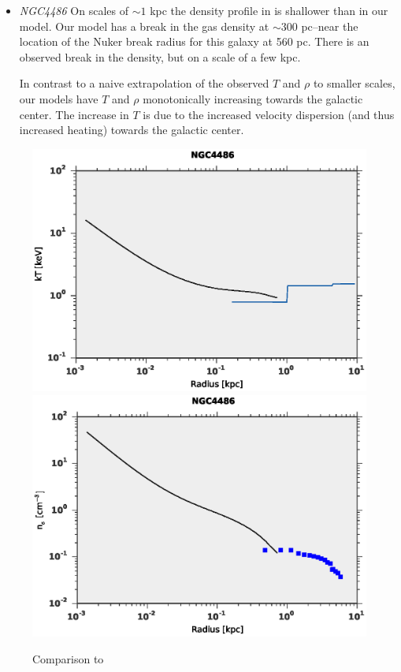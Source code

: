 \documentclass[usenatbib,fleqn]{mn2e}
\begin{document}
\begin{itemize}
\item \emph{NGC4486} On scales of $\sim1$ kpc the density profile in \citealt{AllenDunn+:2006a}  is shallower than in our model. Our model has a break in the gas density at $\sim 300$ pc--near the location of the Nuker break radius for this galaxy at 560 pc. There is an observed break in the density, but on a scale of a few kpc.

In contrast to a naive extrapolation of the observed $T$ and $\rho$ to smaller scales, our models have $T$ and $\rho$ monotonically increasing towards the galactic center. The increase in $T$ is due to the increased velocity dispersion (and thus increased heating) towards the galactic center.
\end{itemize}

\begin{figure}
\includegraphics[width=\columnwidth]{T_compare.eps}
\includegraphics[width=\columnwidth]{dens_compare.eps}
\caption{\label{fig:allen_compare} Comparison to \citealt{AllenDunn+:2006a}}
\end{figure}
\end{document}
